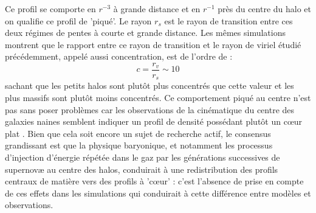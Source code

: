 Ce profil se comporte en $r^{-3}$ à grande distance et en $r^{-1}$ près du centre du halo et on qualifie ce profil de 'piqué'. Le rayon $r_s$ est le rayon de transition entre ces deux régimes de pentes à courte et grande distance. Les mêmes simulations montrent que le rapport entre ce rayon de transition et le rayon de viriel étudié précédemment, appelé aussi concentration, est de l'ordre de :
\begin{equation}
c=\frac{r_v}{r_s}\sim 10
\end{equation}
sachant que les petits halos sont plutôt plus concentrés que cette valeur et les plus massifs sont plutôt moins concentrés. Ce comportement piqué au centre n'est pas sans poser problèmes car les observations de la cinématique du centre des galaxies naines semblent indiquer un profil de densité possédant plutôt un cœur plat . Bien que cela soit encore un sujet de recherche actif, le consensus grandissant est que la physique baryonique, et notamment les processus d'injection d'énergie répétée dans le gaz par les générations successives de supernovæ au centre des halos, conduirait à une redistribution des profils centraux de matière vers des profils à 'cœur' : c'est l'absence de prise en compte de ces effets dans les simulations qui conduirait à cette différence entre modèles et observations.


